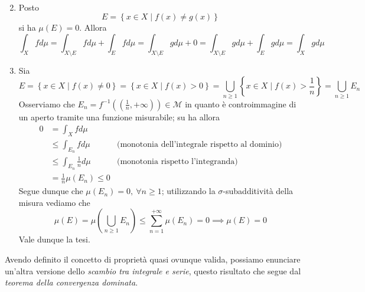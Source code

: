 \begin{demonstration}~{}
	\begin{enumerate}[label=\Roman*]
		\setcounter{enumi}{1}
		\item Posto
		\begin{equation*}
			E=\left\{x\in X\mid f(x)\neq g(x)\right\}
		\end{equation*}
	si ha $\mu\left(E\right)=0$. Allora
	\begin{equation*}
		\int_Xfd\mu=\int_{X\setminus E}fd\mu+\int_Efd\mu=\int_{X\setminus E}gd\mu+0=\int_{X\setminus E}gd\mu+\int_Egd\mu=\int_Xgd\mu
	\end{equation*}
	\item Sia
		\begin{equation*}
			E=\left\{x\in X\mid f(x)\neq 0\right\}=\left\{x\in X\mid f(x)> 0\right\}=\bigcup_{n\geq 1}\left\{x\in X\mid f(x)>\frac{1}{n}\right\}=\bigcup_{n\geq 1}E_n
		\end{equation*}
	Osserviamo che $E_n=f^{-1}\left(\left(\frac{1}{n},+\infty\right)\right)\in\mathcal{M}$ in quanto è controimmagine di un aperto tramite una funzione misurabile; su ha allora
	\begin{align*}
		0&=\int_Xfd\mu&\\
		 &\leq\int_{E_n}fd\mu&\text{(monotonia dell'integrale rispetto al dominio)}\\
		 &\leq\int_{E_n}\frac{1}{n}d\mu&\text{(monotonia rispetto l'integranda)}\\
		 &=\frac{1}{n}\mu\left(E_n\right)\leq 0&
	\end{align*}
	Segue dunque che $\mu\left(E_n\right)=0,\ \forall n\geq 1$; utilizzando la $\sigma$-subadditività della misura vediamo che
	\begin{equation*}
		\mu\left(E\right)=\mu\left(\bigcup_{n\geq 1}E_n\right)\leq\sum_{n=1}^{+\infty}\mu\left(E_n\right)=0\implies \mu\left(E\right)=0
	\end{equation*}
	Vale dunque la tesi.\qedhere
	\end{enumerate}
\end{demonstration}
Avendo definito il concetto di proprietà quasi ovunque valida, possiamo enunciare un'altra versione dello \textit{scambio tra integrale e serie}, questo risultato che segue dal \textit{teorema della convergenza dominata}.
